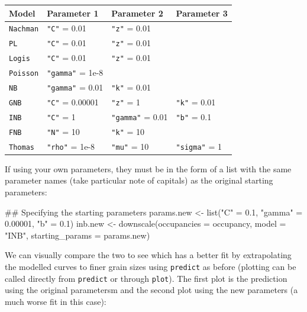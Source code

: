 \documentclass{article}[12pt, a4paper]
\begin{document}
\begin{table}[!ht]
\centering
\begin{tabular}{| l | l | l | l |}
\hline
\textbf{Model} & \textbf{Parameter 1} &	\textbf{Parameter 2} &	\textbf{Parameter 3} \\\hline
\texttt{Nachman}  &	\texttt{"C"} = 0.01       &	\texttt{"z"} = 0.01 & \\	
\texttt{PL}       &	\texttt{"C"} = 0.01       &	\texttt{"z"} = 0.01 & \\
\texttt{Logis}    &	\texttt{"C"} = 0.01       &	\texttt{"z"} = 0.01 & \\	
\texttt{Poisson}  &	\texttt{"gamma"} = 1e-8  &  &	\\
\texttt{NB}       &	\texttt{"gamma"} = 0.01       &	\texttt{"k"} = 0.01 & \\	
\texttt{GNB}	    & \texttt{"C"} = 0.00001    &	\texttt{"z"} = 1    &	\texttt{"k"} = 0.01 \\
\texttt{INB}	    & \texttt{"C"} = 1          &	\texttt{"gamma"} = 0.01 &	\texttt{"b"} = 0.1 \\
\texttt{FNB}	    & \texttt{"N"} = 10         &	\texttt{"k"} = 10   & \\	
\texttt{Thomas}   &	\texttt{"rho"} = 1e-8     &	\texttt{"mu"} = 10  &	\texttt{"sigma"} = 1 \\\hline
\end{tabular}
\label{table:pars}
\end{table}

If using your own parameters, they must be in the form of a list with the same parameter names (take particular note of capitals) as the original starting parameters:

\begin{Schunk}
\begin{Sinput}
## Specifying the starting parameters
params.new <- list("C" = 0.1, "gamma" = 0.00001, "b" = 0.1)
inb.new <- downscale(occupancies = occupancy,
                     model = "INB",
                     starting_params = params.new)
\end{Sinput}
\end{Schunk}

We can visually compare the two to see which has a better fit by extrapolating the modelled curves to finer grain sizes using \texttt{predict} as before (plotting can be called directly from \texttt{predict} or through \texttt{plot}). The first plot is the prediction using the original parametersm and the second plot using the new parameters (a much worse fit in this case):
\end{document}

